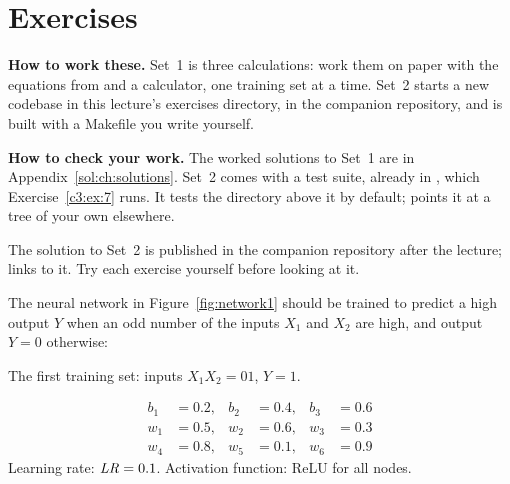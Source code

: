 
\section{Exercises}
\label{c3:sec:exercises}\label{c3:app:b}

\begin{aside}
\textbf{How to work these.} Set~1 is three calculations: work them on paper with the equations
from  and a calculator, one training set at a time. Set~2 starts a new 
codebase in this lecture's exercises directory,  in the
companion repository, and is built with a Makefile you write yourself.

\textbf{How to check your work.} The worked solutions to Set~1 are in
Appendix~\ref{sol:ch:solutions}. Set~2 comes with a test suite, already in
, which Exercise~\ref{c3:ex:7} runs. It tests the
directory above it by default;  points it at a tree of your own elsewhere.

The solution to Set~2 is published in the companion repository after the lecture;
 links to it. Try each exercise yourself before looking at it.
\end{aside}

\label{c3:set:1}

\label{c3:ex:1}
The neural network in Figure~\ref{fig:network1} should be trained to predict a high output $Y$
when an odd number of the inputs $X_1$ and $X_2$ are high, and output $Y = 0$ otherwise:


\noindent The first training set: inputs $X_1X_2 = 01$, $Y = 1$.

\begin{align*}
  b_1 &= 0.2, & b_2 &= 0.4, & b_3 &= 0.6 \\
  w_1 &= 0.5, & w_2 &= 0.6, & w_3 &= 0.3 \\
  w_4 &= 0.8, & w_5 &= 0.1, & w_6 &= 0.9
\end{align*}
Learning rate: $\mathit{LR} = 0.1$. Activation function: ReLU for all nodes.

